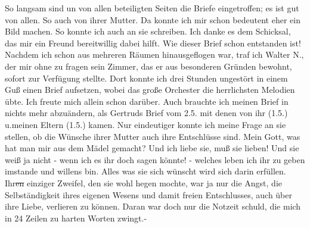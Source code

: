 \def\day{4. 8. 1944.}
\mktitle

So langsam sind un von allen beteiligten Seiten die Briefe eingetroffen; es ist gut von allen.
So auch von ihrer Mutter.
Da konnte ich mir schon bedeutent eher ein Bild machen.
So konnte ich auch an sie schreiben.
Ich danke es dem Schicksal, das mir ein Freund bereitwillig dabei hilft.
Wie dieser Brief schon entstanden ist!
Nachdem ich schon aus mehreren R\"{a}umen hinausgeflogen war, traf ich Walter N., der mir ohne zu fragen sein Zimmer, das er aus besonderen Gr\"{u}nden bewohnt, sofort zur Verf\"{u}gung stellte.
Dort konnte ich drei Stunden ungest\"{o}rt in einem Gu{\ss} einen Brief aufsetzen, wobei das gro{\ss}e Orchester die herrlichsten Melodien \"{u}bte.
Ich freute mich allein schon dar\"{u}ber.
Auch brauchte ich meinen Brief in nichts mehr abzu\"{a}ndern, als Gertruds Brief vom 2.5. mit denen von ihr (1.5.) u.meinen Eltern (1.5.) kamen.
Nur eindeutiger konnte ich meine Frage an sie stellen, ob die W\"{u}nsche ihrer Mutter auch ihre Entschl\"{u}sse sind.
Mein Gott, was hat man mir aus dem M\"{a}del gemacht?
Und ich liebe sie, mu{\ss} sie lieben!
Und sie wei{\ss} ja nicht - wenn ich es ihr doch sagen k\"{o}nnte! - welches leben ich ihr zu geben imstande und willens bin.
Alles was sie sich w\"{u}nscht wird sich darin erf\"{u}llen.
Ihr\st{en} einziger Zweifel, den sie wohl hegen mochte, war ja nur die Angst, die Selbst\"{a}ndigkeit ihres eigenen Wesens und damit freien Entschlusses, auch \"{u}ber ihre Liebe, verlieren zu k\"{o}nnen.
Daran war doch nur die Notzeit schuld, die mich in 24 Zeilen zu harten Worten zwingt.-

\clearpage
